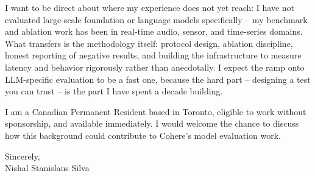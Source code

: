 \documentclass[11pt]{article}
\begin{document}
I want to be direct about where my experience does not yet reach: I have not evaluated large-scale foundation or language models specifically -- my benchmark and ablation work has been in real-time audio, sensor, and time-series domains. What transfers is the methodology itself: protocol design, ablation discipline, honest reporting of negative results, and building the infrastructure to measure latency and behavior rigorously rather than anecdotally. I expect the ramp onto LLM-specific evaluation to be a fast one, because the hard part -- designing a test you can trust -- is the part I have spent a decade building.

I am a Canadian Permanent Resident based in Toronto, eligible to work without sponsorship, and available immediately. I would welcome the chance to discuss how this background could contribute to Cohere's model evaluation work.

\vspace{1em}

Sincerely, \\
Nishal Stanislaus Silva
\end{document}
